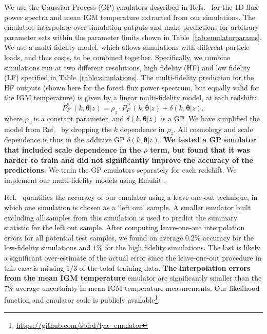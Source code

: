 We use the Gaussian Process (GP) emulators described in Refs.~\cite{2022MNRAS.517.3200F, 2023simsuite} for the 1D flux power spectra and mean IGM temperature extracted from our simulations.
The emulators interpolate over simulation outputs and make predictions for arbitrary parameter sets within the parameter limits shown in Table~\ref{tab:emulatorparams}.
We use a multi-fidelity model, which allows simulations with different particle loads, and thus costs, to be combined together.
Specifically, we combine simulations run at two different resolutions, high fidelity (HF) and low fidelity (LF) specified in Table~\ref{table:simulations}. 
The multi-fidelity prediction for the HF outputs (shown here for the \lya forest flux power spectrum, but equally valid for the IGM temperature) is given by a linear multi-fidelity model, at each redshift:
\begin{equation}
    P_F^{^\mathrm{HF}}(k, \boldsymbol{\theta} | z) = \rho_z \cdot P_F^{^\mathrm{LF}}(k, \boldsymbol{\theta} | z) + \delta(k, \boldsymbol{\theta} | z),
    \label{eq:ko_model}
\end{equation}
where $\rho_z$ is a constant parameter, and $\delta(k, \boldsymbol{\theta} | z)$ is a GP.
We have simplified the model from Ref.~\cite{2022MNRAS.517.3200F} by dropping the $k$ dependence in $\rho_z$.
All cosmology and scale dependence is thus in the additive GP $\delta(k, \boldsymbol{\theta} | z)$.
\textbf{We tested a GP emulator that included scale dependence in the $\rho$ term, but found that it was harder to train and did not significantly improve the accuracy of the predictions.}
We train the GP emulators separately for each redshift. We implement our multi-fidelity models using Emukit \cite{2021arXiv211013293P}.

Ref.~\cite{2023simsuite} quantifies the accuracy of our emulator using a leave-one-out technique, in which one simulation is chosen as a `left out' sample.
A smaller emulator built excluding all samples from this simulation is used to predict the summary statistic for the left out sample.
After computing leave-one-out interpolation errors for all potential test samples, we found on average $0.2\%$ accuracy for the low-fidelity simulations and $1\%$ for the high fidelity simulations.
The last is likely a significant over-estimate of the actual error since the leave-one-out procedure in this case is missing $1/3$ of the total training data.
\textbf{The interpolation errors from the mean IGM temperature} emulator are significantly smaller than the $7\%$ average uncertainty in mean IGM temperature measurements.
Our likelihood function and emulator code is publicly available\footnote{\url{https://github.com/sbird/lya_emulator}}.

